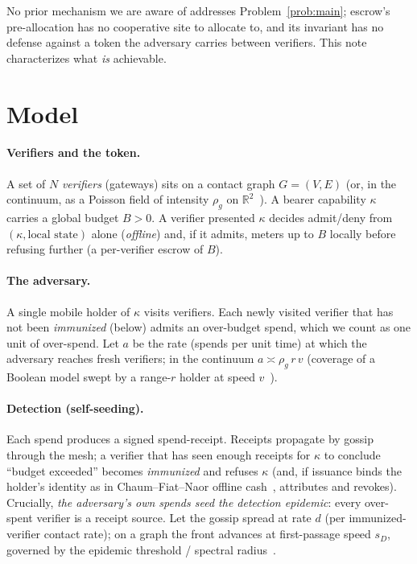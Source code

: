 \documentclass[11pt]{article}
\theoremstyle{plain}
\theoremstyle{definition}
\newcommand{\R}{\mathbb{R}}
\begin{document}
No prior mechanism we are aware of addresses Problem~\ref{prob:main}; escrow's
pre-allocation has no cooperative site to allocate to, and its invariant has no
defense against a token the adversary carries between verifiers. This note
characterizes what \emph{is} achievable.

\section{Model}\label{sec:model}

\paragraph{Verifiers and the token.} A set of $N$ \emph{verifiers} (gateways)
sits on a contact graph $G=(V,E)$ (or, in the continuum, as a Poisson field of
intensity $\rho_g$ on $\R^2$~\cite{StoyanKendallMecke1995}). A bearer capability
$\kappa$ carries a global budget $B>0$. A verifier presented $\kappa$ decides
admit/deny from $(\kappa,\text{local state})$ alone (\emph{offline}) and, if it
admits, meters up to $B$ locally before refusing further (a per-verifier escrow
of $B$).

\paragraph{The adversary.} A single mobile holder of $\kappa$ visits verifiers.
Each newly visited verifier that has not been \emph{immunized} (below) admits an
over-budget spend, which we count as one unit of over-spend. Let $a$ be the rate
(spends per unit time) at which the adversary reaches fresh verifiers; in the
continuum $a \asymp \rho_g\, r\, v$ (coverage of a Boolean model swept by a
range-$r$ holder at speed $v$~\cite{StoyanKendallMecke1995}).

\paragraph{Detection (self-seeding).} Each spend produces a signed
spend-receipt. Receipts propagate by gossip through the mesh; a verifier that has
seen enough receipts for $\kappa$ to conclude ``budget exceeded'' becomes
\emph{immunized} and refuses $\kappa$ (and, if issuance binds the holder's
identity as in Chaum--Fiat--Naor offline cash~\cite{ChaumFiatNaor1988}, attributes
and revokes). Crucially, \emph{the adversary's own spends seed the detection
epidemic}: every over-spent verifier is a receipt source. Let the gossip spread at
rate $d$ (per immunized-verifier contact rate); on a graph the front advances at
first-passage speed $s_D$, governed by the epidemic threshold / spectral
radius~\cite{Ganesh2005Epidemics}.
\end{document}
